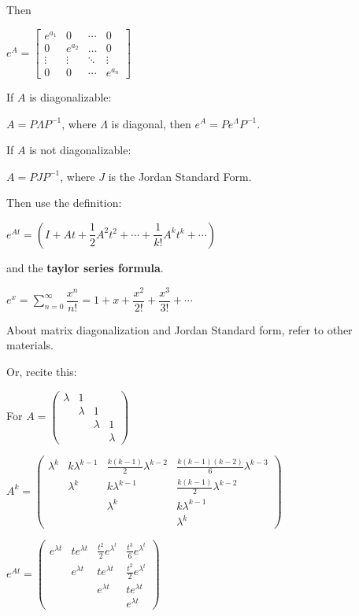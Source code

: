 \documentclass{article}
\begin{document}
\begin{spacing}{1.2}
Then

$e^{A}=\left[ \begin{array}{cccc}{e^{a_{1}}} & {0} & {\cdots} & {0} \\ {0} & {e^{a_{2}}} & {\dots} & {0} \\ {\vdots} & {\vdots} & {\ddots} & {\vdots} \\ {0} & {0} & {\cdots} & {e^{a_{n}}}\end{array}\right]$

If $A$ is diagonalizable:

$A=P \Lambda P^{-1}$, where $\Lambda$ is diagonal, then $e^{A}=P e^{\Lambda} P^{-1}$.

If $A$ is not diagonalizable:

$A=P J P^{-1}$, where $J$ is the Jordan Standard Form.

Then use the definition:

$e^{At} = \left(I+A t+\dfrac{1}{2} A^{2} t^{2}+\cdots+\dfrac{1}{k !} A^{k} t^{k}+\cdots\right)$ 

and the \textbf{taylor series formula}.

$e^{x}=\sum \limits_{n=0}^{\infty} \dfrac{x^{n}}{n !}=1+x+\dfrac{x^{2}}{2 !}+\dfrac{x^{3}}{3 !}+\cdots$

About matrix diagonalization and Jordan Standard form, refer to other materials.


Or, recite this:

For $A=\left( \begin{array}{cccc}
\lambda &1&& \\
&\lambda&1& \\
&&\lambda&1\\
&&&\lambda
\end{array} \right)$

$A^k = \left(
\begin{array}{rrrr}
\lambda^k & k\lambda^{k-1} & \frac{k(k-1)}{2}\lambda^{k-2} & \frac{k(k-1)(k-2)}{6}\lambda^{k-3} \\
&\lambda^k & k\lambda^{k-1} & \frac{k(k-1)}{2}\lambda^{k-2}\\
&&\lambda^k & k\lambda^{k-1}\\
&&&\lambda^k
\end{array}
\right)$

$e^{At} = 
\left(
\begin{array}{rrrr}
e^{\lambda t} & t e^{\lambda t} & \frac{t^2}{2} e^{\lambda ^t } & \frac{t^3}{6} e^{\lambda^t} \\
&e^{\lambda t} & t e^{\lambda t} & \frac{t^2}{2} e^{\lambda ^t } \\
&&e^{\lambda t} & t e^{\lambda t}\\
&&&e^{\lambda t}
\end{array}
\right)
$





\end{spacing}
\end{document}
